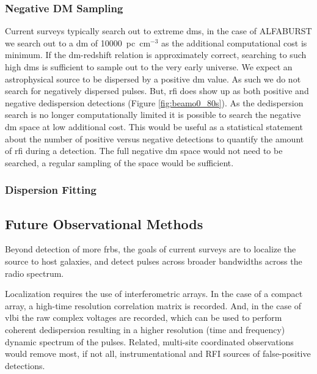 \documentclass[a4paper,fleqn,usenatbib]{mnras}
\begin{document}
\subsubsection{Negative DM Sampling}

Current surveys typically search out to extreme \glspl{dm}, in the case of
ALFABURST we search out to a \gls{dm} of 10000~pc~cm$^{-3}$ as the additional
computational cost is minimum. If the \gls{dm}-redshift relation is
approximately correct, searching to such high \glspl{dm} is sufficient to sample
out to the very early universe. We expect an astrophysical source to be
dispersed by a positive \gls{dm} value. As such we do not search for negatively
dispersed pulses. But, \gls{rfi} does show up as both positive and negative
dedispersion detections (Figure \ref{fig:beamo0_80s}). As the dedispersion
search is no longer computationally limited it is possible to search the
negative \gls{dm} space at low additional cost. This would be useful as a
statistical statement about the number of positive versus negative detections to
quantify the amount of \gls{rfi} during a detection. The full negative \gls{dm}
space would not need to be searched, a regular sampling of the space would be
sufficient.

\subsubsection{Dispersion Fitting}


\subsection{Future Observational Methods}

Beyond detection of more \glspl{frb}, the goals of current surveys are to
localize the source to host galaxies, and detect pulses across broader
bandwidths across the radio spectrum.

Localization requires the use of interferometric arrays. In the case of a
compact array, a high-time resolution correlation matrix is recorded. And, in
the case of \gls{vlbi} the raw complex voltages are recorded, which can be used
to perform coherent dedispersion resulting in a higher resolution (time and
frequency) dynamic spectrum of the pulses.  Related, multi-site coordinated
observations would remove most, if not all, instrumentational and RFI sources of
false-positive detections.
\end{document}
